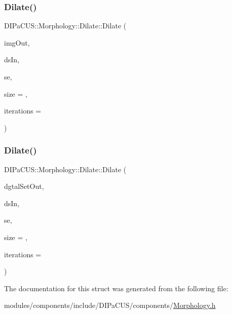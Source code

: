 \subsubsection{\texorpdfstring{Dilate()}{Dilate()}\hspace{0.1cm}{\footnotesize\ttfamily [1/2]}}
{\footnotesize\ttfamily D\+I\+Pa\+C\+U\+S\+::\+Morphology\+::\+Dilate\+::\+Dilate (\begin{DoxyParamCaption}\item[{\mbox{\hyperlink{namespaceDIPaCUS_1_1Morphology_a9aff9edf28d681accfc54435fbefcbee}{Image2D}} \&}]{img\+Out,  }\item[{const \mbox{\hyperlink{namespaceDIPaCUS_1_1Morphology_ab69fa725716b0ed4c311c0d00a292be7}{Digital\+Set}} \&}]{ds\+In,  }\item[{\mbox{\hyperlink{namespaceDIPaCUS_1_1Morphology_a60b552d68432e7992f09717070d9c4e7}{Structuring\+Element}}}]{se,  }\item[{int}]{size = {},  }\item[{int}]{iterations = {} }\end{DoxyParamCaption})}

\mbox{\label{structDIPaCUS_1_1Morphology_1_1Dilate_a031ec2777baa188acdab1aa654c87d68}} 
\subsubsection{\texorpdfstring{Dilate()}{Dilate()}\hspace{0.1cm}{\footnotesize\ttfamily [2/2]}}
{\footnotesize\ttfamily D\+I\+Pa\+C\+U\+S\+::\+Morphology\+::\+Dilate\+::\+Dilate (\begin{DoxyParamCaption}\item[{\mbox{\hyperlink{namespaceDIPaCUS_1_1Morphology_ab69fa725716b0ed4c311c0d00a292be7}{Digital\+Set}} \&}]{dgtal\+Set\+Out,  }\item[{const \mbox{\hyperlink{namespaceDIPaCUS_1_1Morphology_ab69fa725716b0ed4c311c0d00a292be7}{Digital\+Set}} \&}]{ds\+In,  }\item[{\mbox{\hyperlink{namespaceDIPaCUS_1_1Morphology_a60b552d68432e7992f09717070d9c4e7}{Structuring\+Element}}}]{se,  }\item[{int}]{size = {},  }\item[{int}]{iterations = {} }\end{DoxyParamCaption})}



The documentation for this struct was generated from the following file\+:\begin{DoxyCompactItemize}
\item 
modules/components/include/\+D\+I\+Pa\+C\+U\+S/components/\mbox{\hyperlink{Morphology_8h}{Morphology.\+h}}\end{DoxyCompactItemize}
